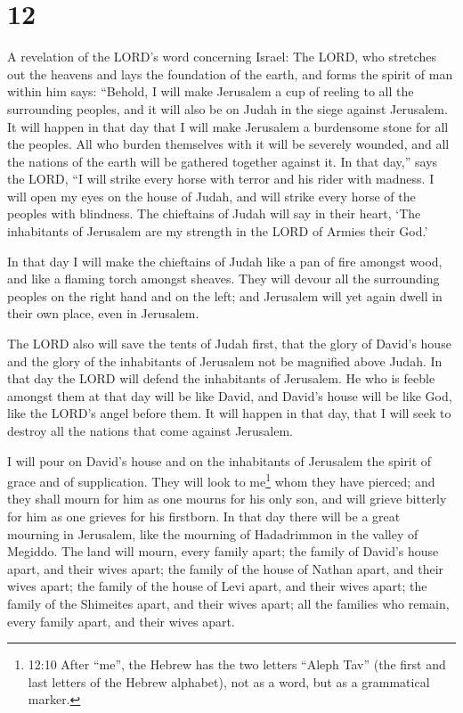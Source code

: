 \hypertarget{section-11}{%
\section{12}\label{section-11}}

 A revelation of the LORD's word concerning Israel: The
LORD, who stretches out the heavens and lays the foundation of the
earth, and forms the spirit of man within him says: 
``Behold, I will make Jerusalem a cup of reeling to all the surrounding
peoples, and it will also be on Judah in the siege against Jerusalem.
 It will happen in that day that I will make Jerusalem a
burdensome stone for all the peoples. All who burden themselves with it
will be severely wounded, and all the nations of the earth will be
gathered together against it.  In that day,'' says the LORD,
``I will strike every horse with terror and his rider with madness. I
will open my eyes on the house of Judah, and will strike every horse of
the peoples with blindness.  The chieftains of Judah will
say in their heart, `The inhabitants of Jerusalem are my strength in the
LORD of Armies their God.'

 In that day I will make the chieftains of Judah like a pan
of fire amongst wood, and like a flaming torch amongst sheaves. They
will devour all the surrounding peoples on the right hand and on the
left; and Jerusalem will yet again dwell in their own place, even in
Jerusalem.

 The LORD also will save the tents of Judah first, that the
glory of David's house and the glory of the inhabitants of Jerusalem not
be magnified above Judah.  In that day the LORD will defend
the inhabitants of Jerusalem. He who is feeble amongst them at that day
will be like David, and David's house will be like God, like the LORD's
angel before them.  It will happen in that day, that I will
seek to destroy all the nations that come against Jerusalem.

 I will pour on David's house and on the inhabitants of
Jerusalem the spirit of grace and of supplication. They will look to
me\footnote{12:10 After ``me'', the Hebrew has the two letters ``Aleph
  Tav'' (the first and last letters of the Hebrew alphabet), not as a
  word, but as a grammatical marker.} whom they have pierced; and they
shall mourn for him as one mourns for his only son, and will grieve
bitterly for him as one grieves for his firstborn.  In that
day there will be a great mourning in Jerusalem, like the mourning of
Hadadrimmon in the valley of Megiddo.  The land will mourn,
every family apart; the family of David's house apart, and their wives
apart; the family of the house of Nathan apart, and their wives apart;
 the family of the house of Levi apart, and their wives
apart; the family of the Shimeites apart, and their wives apart;
 all the families who remain, every family apart, and their
wives apart.

